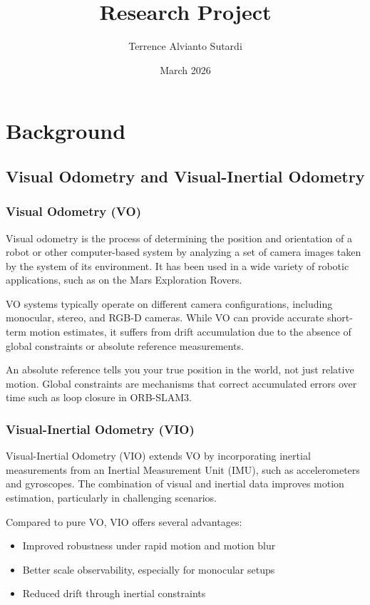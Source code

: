 \documentclass[english, cd=nocolor, cdfont=off, fontsize=11pt]{tudscrreprt}
\title{Research Project}
\author{Terrence Alvianto Sutardi}
\date{March 2026}
\begin{document}
\maketitle
\tableofcontents

\section{Background}

\subsection{Visual Odometry and Visual-Inertial Odometry}

\subsubsection{Visual Odometry (VO)}

Visual odometry is the process of determining the position and orientation of a robot or other computer-based system by analyzing a set of camera images taken by the system of its environment. It has been used in a wide variety of robotic applications, such as on the Mars Exploration Rovers.

VO systems typically operate on different camera configurations, including monocular, stereo, and RGB-D cameras. While VO can provide accurate short-term motion estimates, it suffers from drift accumulation due to the absence of global constraints or absolute reference measurements.

An absolute reference tells you your true position in the world, not just relative motion.
Global constraints are mechanisms that correct accumulated errors over time such as loop closure in ORB-SLAM3.

\subsubsection{Visual-Inertial Odometry (VIO)}

Visual-Inertial Odometry (VIO) extends VO by incorporating inertial measurements from an Inertial Measurement Unit (IMU), such as accelerometers and gyroscopes. The combination of visual and inertial data improves motion estimation, particularly in challenging scenarios.

Compared to pure VO, VIO offers several advantages:
\begin{itemize}
    \item Improved robustness under rapid motion and motion blur
    \item Better scale observability, especially for monocular setups
    \item Reduced drift through inertial constraints
\end{itemize}
\end{document}
